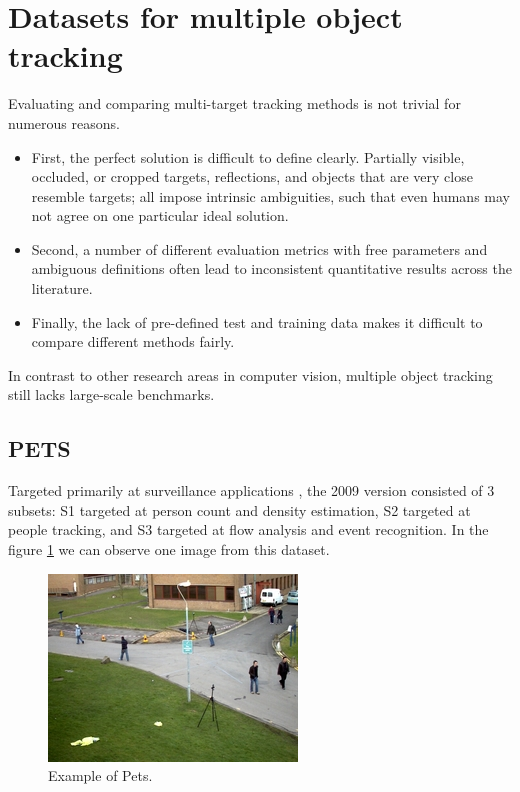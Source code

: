 \section{Datasets for multiple object tracking}\label{datasetracks}

Evaluating and comparing multi-target tracking methods is not trivial for numerous reasons. 

\begin{itemize}

\item First, the perfect solution is difficult to define clearly. Partially visible, occluded, or cropped targets, reflections, and objects that are very close resemble targets; all impose intrinsic ambiguities, such that even humans may not agree on one particular ideal solution.

\item Second, a number of different evaluation metrics with free parameters and ambiguous definitions often lead to inconsistent quantitative results across the literature.

\item Finally, the lack of pre-defined test and training data makes it difficult to compare different methods fairly.

\end{itemize}


In contrast to other research areas in computer vision, multiple object tracking still lacks large-scale benchmarks.

\subsection{PETS}

Targeted primarily at surveillance applications \cite{pets}, the 2009 version consisted of 3 subsets: S1 targeted at person count and density estimation, S2 targeted at people tracking, and S3 targeted at flow analysis and event recognition. In the figure \ref{petsExample} we can observe one image from this dataset.

\begin{figure}[H]
\centering         
\includegraphics[width=0.5\linewidth]{datasetTracking/View_001.jpg}
\caption{Example of Pets.} \label{petsExample}
\end{figure}

